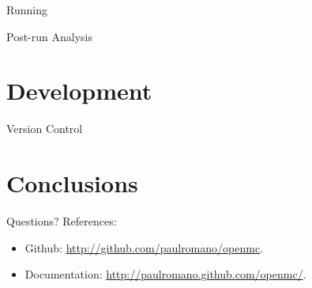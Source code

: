 \documentclass{beamer}
\begin{document}
\begin{frame}{Running}
\end{frame}

\begin{frame}{Post-run Analysis}
\end{frame}

\section{Development}

\begin{frame}{Version Control}
\end{frame}

\section{Conclusions}
\begin{frame}{Questions?}
  References:
  \begin{itemize}
    \item<1-> Github: \url{http://github.com/paulromano/openmc}.
    \item<1-> Documentation: \url{http://paulromano.github.com/openmc/}.
  \end{itemize}
\end{frame}
\end{document}
